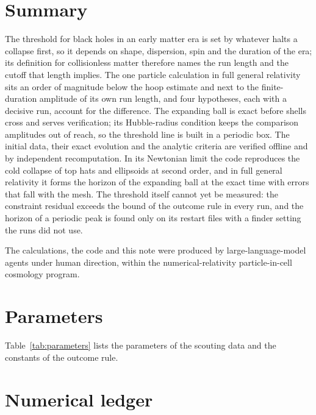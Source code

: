 \documentclass[aps,prd,twocolumn,10pt,superscriptaddress,nofootinbib,longbibliography,floatfix]{revtex4-2}
\begin{document}
\section{Summary}\label{sec:summary}

The threshold for black holes in an early matter era is set by whatever halts a collapse first, so it depends on shape, dispersion, spin and the duration of the era; its definition for collisionless matter therefore names the run length and the cutoff that length implies. The one particle calculation in full general relativity sits an order of magnitude below the hoop estimate and next to the finite-duration amplitude of its own run length, and four hypotheses, each with a decisive run, account for the difference. The expanding ball is exact before shells cross and serves verification; its Hubble-radius condition keeps the comparison amplitudes out of reach, so the threshold line is built in a periodic box. The initial data, their exact evolution and the analytic criteria are verified offline and by independent recomputation. In its Newtonian limit the code reproduces the cold collapse of top hats and ellipsoids at second order, and in full general relativity it forms the horizon of the expanding ball at the exact time with errors that fall with the mesh. The threshold itself cannot yet be measured: the constraint residual exceeds the bound of the outcome rule in every run, and the horizon of a periodic peak is found only on its restart files with a finder setting the runs did not use.

\begin{acknowledgments}
The calculations, the code and this note were produced by large-language-model agents under human direction, within the numerical-relativity particle-in-cell cosmology program.
\end{acknowledgments}

\appendix

\section{Parameters}\label{app:parameters}

Table~\ref{tab:parameters} lists the parameters of the scouting data and the constants of the outcome rule.



\section{Numerical ledger}\label{app:ledger}
\end{document}
